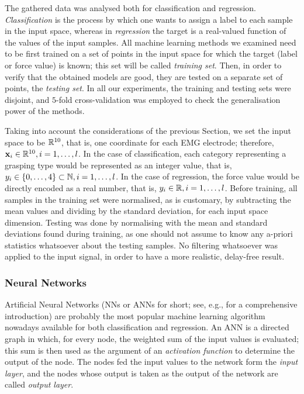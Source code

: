 The gathered data was analysed both for classification and
regression. \emph{Classification} is the process by which one wants to
assign a label to each sample in the input space, whereas in
\emph{regression} the target is a real-valued function of the values
of the input samples. All machine learning methods we examined need to
be first trained on a set of points in the input space for which the
target (label or force value) is known; this set will be called
\emph{training set}. Then, in order to verify that the obtained models
are good, they are tested on a separate set of points, the
\emph{testing set}. In all our experiments, the training and testing
sets were disjoint, and $5$-fold cross-validation was employed to
check the generalisation power of the methods.

Taking into account the considerations of the previous Section, we set
the input space to be $\mathbb{R}^{10}$, that is, one coordinate for each EMG
electrode; therefore, $\mathbf{x}_i \in \mathbb{R}^{10}, i=1,\ldots,l$. In the case
of classification, each category representing a grasping type would be
represented as an integer value, that is, $y_i \in \{0,\ldots,4\}
\subset \mathbb{N}, i=1,\ldots,l$. In the case of regression, the force value
would be directly encoded as a real number, that is, $y_i \in \mathbb{R},
i=1,\ldots,l$. Before training, all samples in the training set were
normalised, as is customary, by subtracting the mean values and
dividing by the standard deviation, for each input space
dimension. Testing was done by normalising with the mean and standard
deviations found during training, as one should not assume to know any
a-priori statistics whatsoever about the testing samples. No filtering
whatsoever was applied to the input signal, in order to have a more
realistic, delay-free result.

\subsubsection{Neural Networks}

Artificial Neural Networks (NNs or ANNs for short; see, e.g.,
\cite{bishop} for a comprehensive introduction) are probably the most
popular machine learning algorithm nowadays available for both
classification and regression. An ANN is a directed graph in which,
for every node, the weighted sum of the input values is evaluated;
this sum is then used as the argument of an \emph{activation function}
to determine the output of the node. The nodes fed the input values to
the network form the \emph{input layer}, and the nodes whose output is
taken as the output of the network are called \emph{output
layer}.

